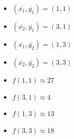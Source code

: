 \documentclass[12pt]{exam}
\begin{document}
\begin{questions}
\begin{multicols}{3}
  \begin{itemize}
  \item $ \left( \overline{x_1}, \overline{y_1} \right)= (1,1) $ \\
  \item  $ \left( \overline{x_2}, \overline{y_1} \right)= (3,1) $ \\
  \item $ \left( \overline{x_1}, \overline{y_2} \right)= (1,3) $ \\
  \item  $ \left( \overline{x_2}, \overline{y_2} \right)= (3,3) $ \\
 \end{itemize}
\begin{itemize}
  \item $f(1,1) \approx 27 $ \\
  \item  $f(3,1) \approx 4 $ \\
  \item $ f (1,3) \approx 13 $ \\
  \item  $ f(3,3) \approx 18$ \\
 \end{itemize}
\end{multicols}



\end{questions}
\end{document}
